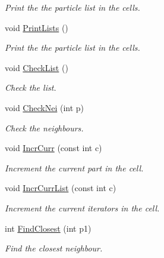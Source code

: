 \begin{DoxyCompactItemize}
\begin{DoxyCompactList}\small\item\em Print the the particle list in the cells. \end{DoxyCompactList}\item 
void \hyperlink{classDdLinkedList_aff89725be8d743f07f318ef0c06858e1}{Print\+Lists} ()\hypertarget{classDdLinkedList_aff89725be8d743f07f318ef0c06858e1}{}\label{classDdLinkedList_aff89725be8d743f07f318ef0c06858e1}

\begin{DoxyCompactList}\small\item\em Print the the particle list in the cells. \end{DoxyCompactList}\item 
void \hyperlink{classDdLinkedList_a4e589206ab9bc4752d547111d6bba6e7}{Check\+List} ()\hypertarget{classDdLinkedList_a4e589206ab9bc4752d547111d6bba6e7}{}\label{classDdLinkedList_a4e589206ab9bc4752d547111d6bba6e7}

\begin{DoxyCompactList}\small\item\em Check the list. \end{DoxyCompactList}\item 
void \hyperlink{classDdLinkedList_ad6d4b1b657a39ed64c2c45d4706dbcc1}{Check\+Nei} (int p)\hypertarget{classDdLinkedList_ad6d4b1b657a39ed64c2c45d4706dbcc1}{}\label{classDdLinkedList_ad6d4b1b657a39ed64c2c45d4706dbcc1}

\begin{DoxyCompactList}\small\item\em Check the neighbours. \end{DoxyCompactList}\item 
void \hyperlink{classDdLinkedList_ab61672aad0bc83dc07c8efd5a4543fc7}{Incr\+Curr} (const int c)
\begin{DoxyCompactList}\small\item\em Increment the current part in the cell. \end{DoxyCompactList}\item 
void \hyperlink{classDdLinkedList_a0c040f6773c460a8eb46bff752c08d2d}{Incr\+Curr\+List} (const int c)
\begin{DoxyCompactList}\small\item\em Increment the current iterators in the cell. \end{DoxyCompactList}\item 
int \hyperlink{classDdLinkedList_a0d08a6310d088c729b6b1e496203a3d9}{Find\+Closest} (int p1)\hypertarget{classDdLinkedList_a0d08a6310d088c729b6b1e496203a3d9}{}\label{classDdLinkedList_a0d08a6310d088c729b6b1e496203a3d9}

\begin{DoxyCompactList}\small\item\em Find the closest neighbour. \end{DoxyCompactList}\end{DoxyCompactItemize}
